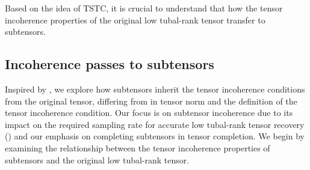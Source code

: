 \documentclass[twoside,12pt]{article}
\begin{document}
Based on the idea of TSTC, it is crucial to  understand that how the tensor incoherence properties of the original low tubal-rank tensor transfer to subtensors. 
\subsection{Incoherence passes to subtensors }\label{incoherence_conditions}
Inspired by \citep[Theorem~3.5]{cai2021robust}, we explore how subtensors inherit the tensor incoherence conditions from the original tensor, differing from \citep{mohammadpour2023tensor} in tensor norm and the definition of the tensor incoherence condition. Our focus is on subtensor incoherence due to its impact on the required sampling rate for accurate low tubal-rank tensor recovery () and our emphasis on completing subtensors in tensor completion. We begin by examining the relationship between the tensor incoherence properties of subtensors and the original low tubal-rank tensor.
 
\end{document}
